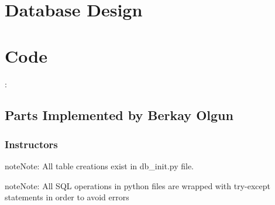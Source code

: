 \documentclass[letterpaper,10pt,english]{sphinxmanual}
\begin{document}
\section{Database Design}
\label{\detokenize{developer/index:database-design}}



\section{Code}
\label{\detokenize{developer/index:code}}

:

\begin{sphinxVerbatim}[commandchars=\\\{\}]
  

    

        
           
\end{sphinxVerbatim}


\subsection{Parts Implemented by Berkay Olgun}
\label{\detokenize{developer/berkay:parts-implemented-by-berkay-olgun}}\label{\detokenize{developer/berkay::doc}}

\subsubsection{Instructors}
\label{\detokenize{developer/berkay:instructors}}
\begin{sphinxadmonition}{note}{Note:}
All table creations exist in db\_init.py file.
\end{sphinxadmonition}

\begin{sphinxadmonition}{note}{Note:}
All SQL operations in python files are wrapped with try-except statements in order to avoid errors
\end{sphinxadmonition}
\end{document}
